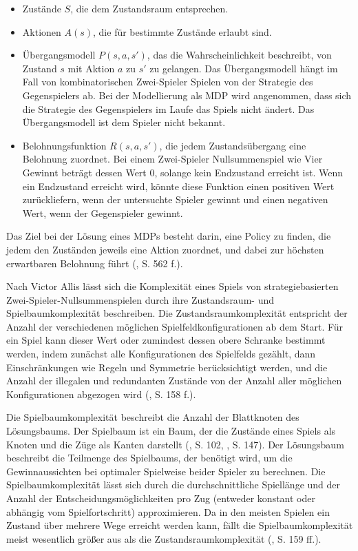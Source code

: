\begin{itemize}
	
\item Zustände $S$, die dem Zustandsraum entsprechen.
\item Aktionen $A(s)$, die für bestimmte Zustände erlaubt sind.
\item Übergangsmodell $P(s, a, s')$, das die Wahrscheinlichkeit beschreibt, von Zustand $s$ mit Aktion $a$ zu $s'$ zu gelangen. Das Übergangsmodell hängt im Fall von kombinatorischen Zwei-Spieler Spielen von der Strategie des Gegenspielers ab. Bei der Modellierung als MDP wird angenommen, dass sich die Strategie des Gegenspielers im Laufe das Spiels nicht ändert. Das Übergangsmodell ist dem Spieler nicht bekannt.
\item Belohnungsfunktion $R(s, a, s')$, die jedem Zustandsübergang eine Belohnung zuordnet. Bei einem Zwei-Spieler Nullsummenspiel wie Vier Gewinnt beträgt dessen Wert 0, solange kein Endzustand erreicht ist. Wenn ein Endzustand erreicht wird, könnte diese Funktion einen positiven Wert zurückliefern, wenn der untersuchte Spieler gewinnt und einen negativen Wert, wenn der Gegenspieler gewinnt.

\end{itemize}

Das Ziel bei der Lösung eines MDPs besteht darin, eine Policy zu finden, die jedem den Zuständen jeweils eine Aktion zuordnet, und dabei zur höchsten erwartbaren Belohnung führt (\cite{Russell.2020}, S. 562 f.).


Nach Victor Allis lässt sich die Komplexität eines Spiels von strategiebasierten Zwei-Spieler-Nullsummenspielen durch ihre Zustandsraum- und Spielbaumkomplexität beschreiben. Die Zustandsraumkomplexität entspricht der Anzahl der verschiedenen möglichen Spielfeldkonfigurationen ab dem Start. Für ein Spiel kann dieser Wert oder zumindest dessen obere Schranke bestimmt werden, indem zunächst alle Konfigurationen des Spielfelds gezählt, dann Einschränkungen wie Regeln und Symmetrie berücksichtigt werden, und die Anzahl der illegalen und redundanten Zustände von der Anzahl aller möglichen Konfigurationen abgezogen wird (\cite{Allis.1994}, S. 158 f.).

Die Spielbaumkomplexität beschreibt die Anzahl der Blattknoten des Lösungsbaums. Der Spielbaum ist ein Baum, der die Zustände eines Spiels als Knoten und die Züge als Kanten darstellt (\cite{Bewersdorff.2018}, S. 102, \cite{Russell.2020}, S. 147). Der Lösungsbaum beschreibt die Teilmenge des Spielbaums, der benötigt wird, um die Gewinnaussichten bei optimaler Spielweise beider Spieler zu berechnen. Die Spielbaumkomplexität lässt sich durch die durchschnittliche Spiellänge und der Anzahl der Entscheidungsmöglichkeiten pro Zug (entweder konstant oder abhängig vom Spielfortschritt) approximieren. Da in den meisten Spielen ein Zustand über mehrere Wege erreicht werden kann, fällt die Spielbaumkomplexität meist wesentlich größer aus als die Zustandsraumkomplexität (\cite{Allis.1994}, S. 159 ff.).

